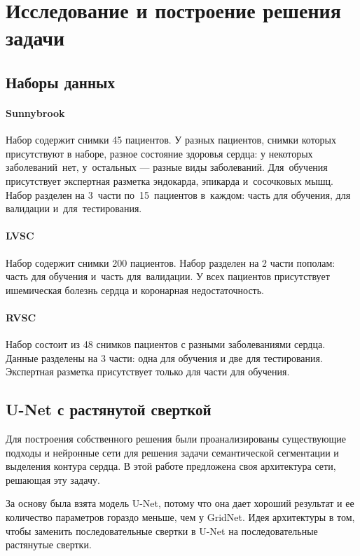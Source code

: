\section{Исследование и построение решения задачи}

\subsection{Наборы данных}

\paragraph{Sunnybrook}

Набор содержит снимки 45 пациентов. У разных пациентов, снимки которых присутствуют в наборе, разное состояние здоровья сердца: у некоторых заболеваний~нет, у~остальных — разные виды заболеваний. Для~обучения присутствует экспертная разметка эндокарда, эпикарда и~сосочковых мышц. Набор разделен на 3~части по~15~пациентов в~каждом: часть для обучения, для валидации и~для~тестирования.

\paragraph{LVSC}

Набор содержит снимки 200 пациентов. Набор разделен на 2 части пополам: часть для обучения и~часть для~валидации. У всех пациентов присутствует ишемическая болезнь сердца и коронарная недостаточность.

\paragraph{RVSC}

Набор состоит из 48 снимков пациентов с разными заболеваниями сердца. Данные разделены на 3 части: одна для обучения и две для тестирования. Экспертная разметка присутствует только для части для обучения.

\subsection{U-Net с растянутой сверткой}

Для построения собственного решения были проанализированы существующие подходы и нейронные сети для решения задачи семантической сегментации и выделения контура сердца. В этой работе предложена своя архитектура сети, решающая эту задачу.

За основу была взята модель U-Net, потому что она дает хороший результат и ее количество параметров гораздо меньше, чем у GridNet. Идея архитектуры в том, чтобы заменить последовательные свертки в U-Net на последовательные растянутые свертки.

